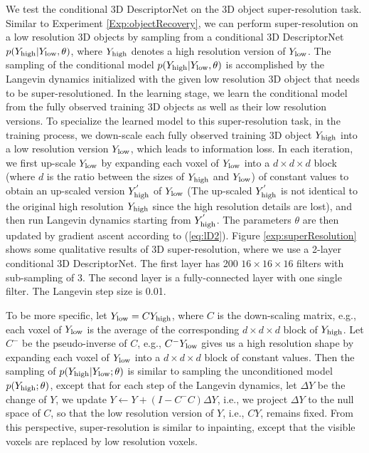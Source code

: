 \documentclass[10pt,twocolumn,letterpaper]{article}
\begin{document}
We test the conditional 3D DescriptorNet on the 3D object super-resolution task. Similar to Experiment \ref{Exp:objectRecovery}, we can perform super-resolution on a low resolution 3D objects by sampling from a conditional 3D DescriptorNet $p(Y_{\rm high}|Y_{\rm low}, \theta)$, where $Y_{\rm high}$ denotes a high resolution version of $Y_{\rm low}$. 
The sampling of the conditional model $p(Y_{\rm high}|Y_{\rm low}, \theta)$ is accomplished by the Langevin dynamics initialized with the given low resolution 3D object that needs to be super-resolutioned. In the learning stage, we learn the conditional model from the fully observed training 3D objects as well as their low resolution versions. To specialize the learned model to this super-resolution task, in the training process, we down-scale each fully observed training 3D object $Y_{\rm high}$ into a low resolution version $Y_{\rm low}$, which leads to information loss. In each iteration, we first up-scale $Y_{\rm low}$ by expanding each voxel of $Y_{\rm low}$ into a $d \times d \times d$ block (where $d$ is the ratio between the sizes of $Y_{\rm high}$ and $Y_{\rm low}$) of constant values to obtain an up-scaled version  $Y^{'}_{\rm high}$ of $Y_{\rm low}$ (The up-scaled $Y^{'}_{\rm high}$ is not identical to the original high resolution $Y_{\rm high}$ since the high resolution details are lost), and then run Langevin dynamics starting from $Y^{'}_{\rm high}$. The parameters $\theta$ are then updated by gradient ascent according to (\ref{eq:lD2}). Figure \ref{exp:superResolution} shows some qualitative results of  3D super-resolution, where we use a 2-layer conditional 3D DescriptorNet. The first layer has 200 $16 \times 16 \times 16$ filters with sub-sampling of 3. The second layer is a fully-connected layer with one single filter. The Langevin step size is 0.01.

To be more specific, let $Y_{\rm low} = C Y_{\rm high}$, where $C$ is the down-scaling matrix, e.g., each voxel of $Y_{\rm low}$ is the average of  the corresponding $d \times d \times d$ block of $Y_{\rm high}$. Let $C^{-}$ be the pseudo-inverse of $C$, e.g., $C^{-} Y_{\rm low}$ gives us a high resolution shape by expanding each voxel of $Y_{\rm low}$ into a $d \times d\times d$ block of constant values. Then the sampling of $p(Y_{\rm high} | Y_{\rm low}; \theta)$ is similar to sampling the unconditioned model $p(Y_{\rm high}; \theta)$, except that for each step of the Langevin dynamics, let $\Delta Y$ be the change of $Y$, we update $Y \leftarrow Y +  (I - C^{-} C) \Delta Y$, i.e., we project $\Delta Y$ to the null space of $C$, so that  the low resolution version of $Y$, i.e., $CY$, remains fixed.    From this perspective, super-resolution is similar to inpainting, except that the visible voxels are replaced by low resolution voxels. 
\end{document}
